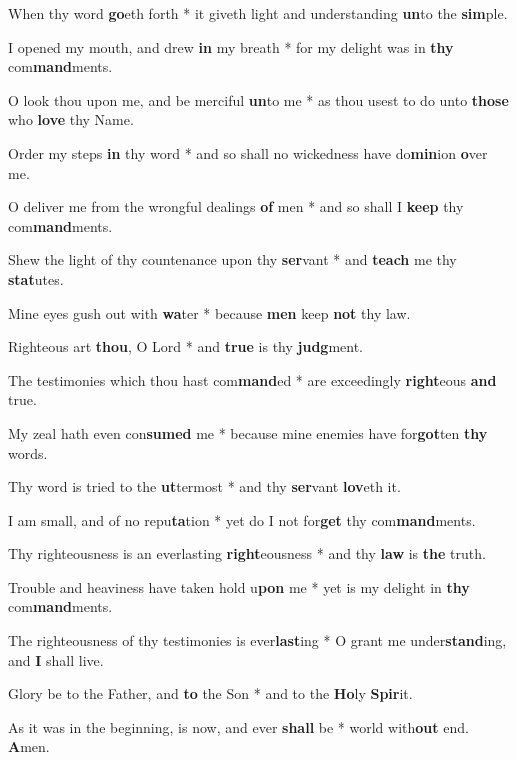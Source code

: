 \begin{multicols}{2}
	When thy word \textbf{go}eth forth * it giveth light and understanding \textbf{un}to the \textbf{sim}ple.
	
	I opened my mouth, and drew \textbf{in} my breath * for my delight was in \textbf{thy} com\textbf{mand}ments.
	
	O look thou upon me, and be merciful \textbf{un}to me * as thou usest to do unto \textbf{those} who \textbf{love} thy Name.
	
	Order my steps \textbf{in} thy word * and so shall no wickedness have do\textbf{min}ion \textbf{o}ver me.
	
	O deliver me from the wrongful dealings \textbf{of} men * and so shall I \textbf{keep} thy com\textbf{mand}ments.
	
	Shew the light of thy countenance upon thy \textbf{ser}vant * and \textbf{teach} me thy \textbf{stat}utes.
	
	Mine eyes gush out with \textbf{wa}ter * because \textbf{men} keep \textbf{not} thy law.
	
	Righteous art \textbf{thou}, O Lord * and \textbf{true} is thy \textbf{judg}ment.
	
	The testimonies which thou hast com\textbf{mand}ed * are exceedingly \textbf{right}eous \textbf{and} true.
	
	My zeal hath even con\textbf{sumed} me * because mine enemies have for\textbf{got}ten \textbf{thy} words.
	
	Thy word is tried to the \textbf{ut}termost * and thy \textbf{ser}vant \textbf{lov}eth it.
	
	I am small, and of no repu\textbf{ta}tion * yet do I not for\textbf{get} thy com\textbf{mand}ments.
	
	Thy righteousness is an everlasting \textbf{right}eousness * and thy \textbf{law} is \textbf{the} truth.
	
	Trouble and heaviness have taken hold u\textbf{pon} me * yet is my delight in \textbf{thy} com\textbf{mand}ments.
	
	The righteousness of thy testimonies is ever\textbf{last}ing * O grant me under\textbf{stand}ing, and \textbf{I} shall live.
	
	Glory be to the Father, and \textbf{to} the Son * and to the \textbf{Ho}ly \textbf{Spir}it.
	
	As it was in the beginning, is now, and ever \textbf{shall} be * world with\textbf{out} end. \textbf{A}men.
\end{multicols}